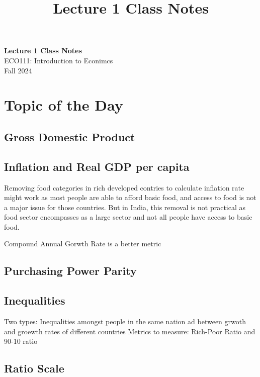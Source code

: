 \documentclass[11pt]{article}
\theoremstyle{definition}
\begin{document}
\setcounter{section}{0}
\title{Lecture 1 Class Notes}

\thispagestyle{empty}

\begin{center}
{\LARGE \bf Lecture 1 Class Notes}\\
{\large ECO111: Introduction to Econimcs}\\
Fall 2024
\end{center}


\tableofcontents


\section{Topic of the Day}
\subsection{Gross Domestic Product}
\subsection{Inflation and Real GDP per capita}
Removing food categories in rich developed contries to calculate inflation rate might work as most people are able to afford basic food, and access to food is not a major issue for those countries. But in India, this removal is not practical as food sector encompasses as a large sector and not all people have access to basic food.

Compound Annual Gorwth Rate is a better metric


\subsection{Purchasing Power Parity}

\subsection{Inequalities}
Two types: Inequalities amongst people in the same nation ad between grwoth and groewth rates of different countries
Metrics to measure: Rich-Poor Ratio and 90-10 ratio

\subsection{Ratio Scale}
\end{document}
